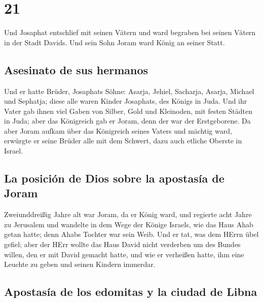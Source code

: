 \hypertarget{section-20}{%
\section{21}\label{section-20}}

 Und Josaphat entschlief mit seinen Vätern und ward
begraben bei seinen Vätern in der Stadt Davids. Und sein Sohn Joram ward
König an seiner Statt.

\hypertarget{asesinato-de-sus-hermanos}{%
\subsection{Asesinato de sus hermanos}\label{asesinato-de-sus-hermanos}}

 Und er hatte Brüder, Josaphats Söhne: Asarja, Jehiel,
Sacharja, Asarja, Michael und Sephatja; diese alle waren Kinder
Josaphats, des Königs in Juda.  Und ihr Vater gab ihnen
viel Gaben von Silber, Gold und Kleinoden, mit festen Städten in Juda;
aber das Königreich gab er Joram, denn der war der Erstgeborene.
 Da aber Joram aufkam über das Königreich seines Vaters
und mächtig ward, erwürgte er seine Brüder alle mit dem Schwert, dazu
auch etliche Oberste in Israel.

\hypertarget{la-posiciuxf3n-de-dios-sobre-la-apostasuxeda-de-joram}{%
\subsection{La posición de Dios sobre la apostasía de
Joram}\label{la-posiciuxf3n-de-dios-sobre-la-apostasuxeda-de-joram}}

 Zweiunddreißig Jahre alt war Joram, da er König ward, und
regierte acht Jahre zu Jerusalem  und wandelte in dem Wege
der Könige Israels, wie das Haus Ahab getan hatte; denn Ahabs Tochter
war sein Weib. Und er tat, was dem HErrn übel gefiel; 
aber der HErr wollte das Haus David nicht verderben um des Bundes
willen, den er mit David gemacht hatte, und wie er verheißen hatte, ihm
eine Leuchte zu geben und seinen Kindern immerdar.

\hypertarget{apostasuxeda-de-los-edomitas-y-la-ciudad-de-libna}{%
\subsection{Apostasía de los edomitas y la ciudad de
Libna}\label{apostasuxeda-de-los-edomitas-y-la-ciudad-de-libna}}

